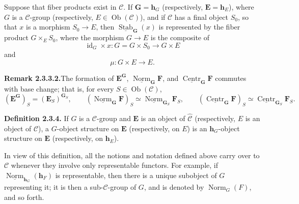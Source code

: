 Suppose that fiber products exist in \(\mathscr C\). If
\(\mathbf G=\mathbf h_G\) (respectively,
\(\mathbf E=\mathbf h_E\)), where \(G\) is a \(\mathscr C\)-group
(respectively, \(E\in\operatorname{Ob}(\mathscr C)\)), and if
\(\mathscr C\) has a final object \(S_0\), so that \(x\) is a morphism
\(S_0\to E\), then
\(\underline{\operatorname{Stab}}_{\mathbf G}(x)\) is represented by
the fiber product \(G\times_E S_0\), where the morphism \(G\to E\) is
the composite of
\[
  \operatorname{id}_G\times x:
  G=G\times S_0\longrightarrow G\times E
\]
and
\[
  \mu:G\times E\longrightarrow E.
\]

\medskip
\noindent\textbf{Remark 2.3.3.2.}\footnotemark[\value{footnote}]
The formation of
\(\mathbf E^{\mathbf G}\),
\(\underline{\operatorname{Norm}}_{\mathbf G}\mathbf F\), and
\(\underline{\operatorname{Centr}}_{\mathbf G}\mathbf F\) commutes
with base change; that is, for every
\(S\in\operatorname{Ob}(\mathscr C)\),
\[
  (\mathbf E^{\mathbf G})_S=(\mathbf E_S)^{\mathbf G_S},
  \qquad
  (\underline{\operatorname{Norm}}_{\mathbf G}\mathbf F)_S
    \simeq
  \underline{\operatorname{Norm}}_{\mathbf G_S}\mathbf F_S,
  \qquad
  (\underline{\operatorname{Centr}}_{\mathbf G}\mathbf F)_S
    \simeq
  \underline{\operatorname{Centr}}_{\mathbf G_S}\mathbf F_S.
\]

\medskip
\noindent\textbf{Definition 2.3.4.}
If \(G\) is a \(\mathscr C\)-group and \(\mathbf E\) is an object of
\(\widehat{\mathscr C}\) (respectively, \(E\) is an object of
\(\mathscr C\)), a \(G\)-object structure on \(\mathbf E\)
(respectively, on \(E\)) is an \(\mathbf h_G\)-object structure on
\(\mathbf E\) (respectively, on \(\mathbf h_E\)).

In view of this definition, all the notions and notation defined above
carry over to \(\mathscr C\) whenever they involve only representable
functors. For example, if
\(\underline{\operatorname{Norm}}_{\mathbf h_G}(\mathbf h_F)\) is
representable, then there is a unique subobject of \(G\) representing
it; it is then a sub-\(\mathscr C\)-group of \(G\), and is denoted by
\(\operatorname{Norm}_G(F)\), and so forth.

